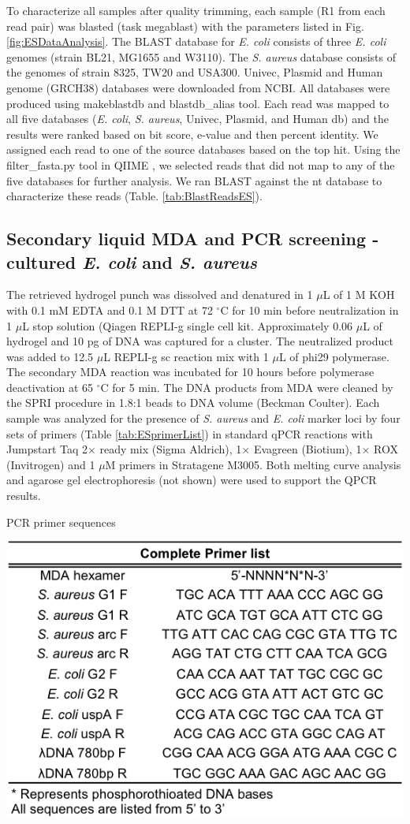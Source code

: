 To characterize all samples after quality trimming, each sample (R1 from each read pair) was blasted (task megablast) with the parameters listed in Fig. \ref{fig:ESDataAnalysis}. The BLAST database for \textit{E. coli} consists of three \textit{E. coli} genomes (strain BL21, MG1655 and W3110). The \textit{S. aureus} database consists of the genomes of strain 8325, TW20 and USA300. Univec, Plasmid and Human genome (GRCH38) databases were downloaded from NCBI. All databases were produced using makeblastdb and blastdb\_alias tool. Each read was mapped to all five databases (\textit{E. coli}, \textit{S. aureus}, Univec, Plasmid, and Human db) and the results were ranked based on bit score, e-value and then percent identity. We assigned each read to one of the source databases based on the top hit. Using the filter\_fasta.py tool in QIIME  \cite{Caporaso:2010jf}, we selected reads that did not map to any of the five databases for further analysis. We ran BLAST against the nt database to characterize these reads (Table. \ref{tab:BlastReadsES}). 

\subsection{Secondary liquid MDA and PCR screening - cultured \textit{E. coli} and \textit{S. aureus}}
The retrieved hydrogel punch was dissolved and denatured in 1 $\mu$L of 1 M KOH with 0.1 mM EDTA and 0.1 M DTT at 72 $^{\circ}$C for 10 min before neutralization in 1 $\mu$L stop solution (Qiagen REPLI-g single cell kit. Approximately 0.06 $\mu$L of hydrogel and 10 pg of DNA was captured for a cluster. The neutralized product was added to 12.5 $\mu$L REPLI-g sc reaction mix with 1 $\mu$L of phi29 polymerase. The secondary MDA reaction was incubated for 10 hours before polymerase deactivation at 65 $^{\circ}$C for 5 min. The DNA products from MDA were cleaned by the SPRI procedure in 1.8:1 beads to DNA volume (Beckman Coulter). Each sample was analyzed for the presence of \textit{S. aureus} and \textit{E. coli} marker loci by four sets of primers (Table \ref{tab:ESprimerList}) in standard qPCR reactions with Jumpstart Taq 2$\times$ ready mix (Sigma Aldrich), 1$\times$ Evagreen (Biotium), 1$\times$ ROX (Invitrogen) and 1 $\mu$M primers in Stratagene M3005. Both melting curve analysis and agarose gel electrophoresis (not shown) were used to support the QPCR results.

\begin{table}
\caption{PCR primer sequences}
\label{tab:ESprimerList}
\begin{center}
\includegraphics[width=0.5\linewidth]{./figures/ESprimerList}
\end{center}
\end{table}

